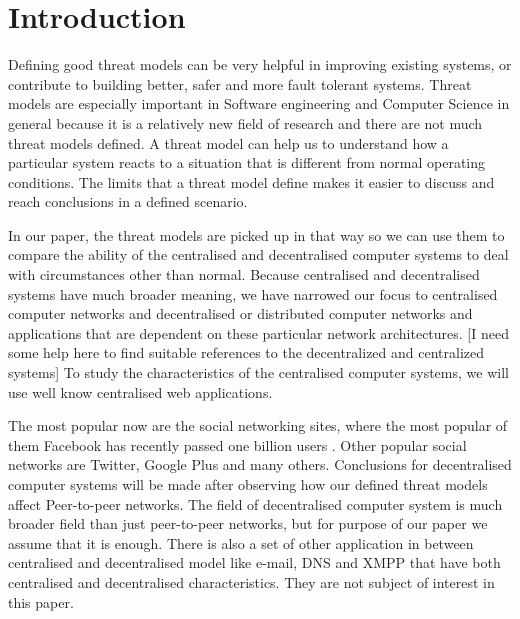 \section{Introduction}
Defining good threat models can be very helpful in improving existing systems, or contribute to building better, safer and more fault tolerant systems. Threat models are especially important in Software engineering and Computer Science in general because it is a relatively new field of research and there are not much threat models defined. A threat model can help us to understand how a particular system reacts to a situation that is different from normal operating conditions. The limits that a threat model define makes it easier to discuss and reach conclusions in a defined scenario.

In our paper, the threat models are picked up in that way so we can use them to compare the ability of the centralised and decentralised computer systems to deal with circumstances other than normal. Because centralised and decentralised systems have much broader meaning, we have narrowed our focus to centralised computer networks and decentralised or distributed computer networks and applications that are dependent on these particular network architectures. [I need some help here to find suitable references to the decentralized and centralized systems] To study the characteristics of the centralised computer systems, we will use well know centralised web applications. 

The most popular now are the social networking sites, where the most popular of them Facebook has recently passed one billion users \cite{web:facebookpassesbillion}. Other popular social networks are Twitter, Google Plus and many others. Conclusions for decentralised computer systems will be made after observing how our defined threat models affect Peer-to-peer networks. The field of decentralised computer system is much broader field than just peer-to-peer networks, but for purpose of our paper we assume that it is enough. There is also a set of other application in between centralised and decentralised model like e-mail, DNS and XMPP that have both centralised and decentralised characteristics. They are not subject of interest in this paper.

